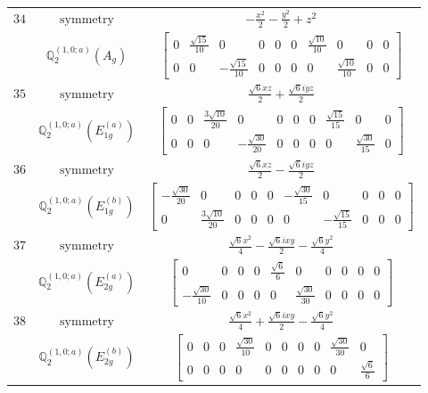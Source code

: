 \documentclass[fleqn,8pt,landscape]{jsarticle}
\begin{document}
\begin{longtable}{ccc}
$ 34 $ & $ \text{symmetry} $ & $ - \frac{x^{2}}{2} - \frac{y^{2}}{2} + z^{2} $ \\
$  $ & $ \mathbb{Q}_{2}^{(1,0;a)}(A_{g}) $ & $ \begin{bmatrix} 0 & \frac{\sqrt{15}}{10} & 0 & 0 & 0 & 0 & \frac{\sqrt{10}}{10} & 0 & 0 & 0 \\ 0 & 0 & - \frac{\sqrt{15}}{10} & 0 & 0 & 0 & 0 & \frac{\sqrt{10}}{10} & 0 & 0 \end{bmatrix} $ \\ \hline
$ 35 $ & $ \text{symmetry} $ & $ \frac{\sqrt{6} x z}{2} + \frac{\sqrt{6} i y z}{2} $ \\
$  $ & $ \mathbb{Q}_{2}^{(1,0;a)}(E_{1g}^{(a)}) $ & $ \begin{bmatrix} 0 & 0 & \frac{3 \sqrt{10}}{20} & 0 & 0 & 0 & 0 & \frac{\sqrt{15}}{15} & 0 & 0 \\ 0 & 0 & 0 & - \frac{\sqrt{30}}{20} & 0 & 0 & 0 & 0 & \frac{\sqrt{30}}{15} & 0 \end{bmatrix} $ \\ \hline
$ 36 $ & $ \text{symmetry} $ & $ \frac{\sqrt{6} x z}{2} - \frac{\sqrt{6} i y z}{2} $ \\
$  $ & $ \mathbb{Q}_{2}^{(1,0;a)}(E_{1g}^{(b)}) $ & $ \begin{bmatrix} - \frac{\sqrt{30}}{20} & 0 & 0 & 0 & 0 & - \frac{\sqrt{30}}{15} & 0 & 0 & 0 & 0 \\ 0 & \frac{3 \sqrt{10}}{20} & 0 & 0 & 0 & 0 & - \frac{\sqrt{15}}{15} & 0 & 0 & 0 \end{bmatrix} $ \\ \hline
$ 37 $ & $ \text{symmetry} $ & $ \frac{\sqrt{6} x^{2}}{4} - \frac{\sqrt{6} i x y}{2} - \frac{\sqrt{6} y^{2}}{4} $ \\
$  $ & $ \mathbb{Q}_{2}^{(1,0;a)}(E_{2g}^{(a)}) $ & $ \begin{bmatrix} 0 & 0 & 0 & 0 & \frac{\sqrt{6}}{6} & 0 & 0 & 0 & 0 & 0 \\ - \frac{\sqrt{30}}{10} & 0 & 0 & 0 & 0 & \frac{\sqrt{30}}{30} & 0 & 0 & 0 & 0 \end{bmatrix} $ \\ \hline
$ 38 $ & $ \text{symmetry} $ & $ \frac{\sqrt{6} x^{2}}{4} + \frac{\sqrt{6} i x y}{2} - \frac{\sqrt{6} y^{2}}{4} $ \\
$  $ & $ \mathbb{Q}_{2}^{(1,0;a)}(E_{2g}^{(b)}) $ & $ \begin{bmatrix} 0 & 0 & 0 & \frac{\sqrt{30}}{10} & 0 & 0 & 0 & 0 & \frac{\sqrt{30}}{30} & 0 \\ 0 & 0 & 0 & 0 & 0 & 0 & 0 & 0 & 0 & \frac{\sqrt{6}}{6} \end{bmatrix} $ \\ \hline

\end{longtable}
\end{document}
